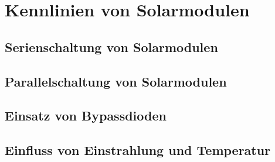 \newpage
\section{Kennlinien von Solarmodulen}
\subsection{Serienschaltung von Solarmodulen}




\subsection{Parallelschaltung von Solarmodulen}





\subsection{Einsatz von Bypassdioden}






\subsection{Einfluss von Einstrahlung und Temperatur}














